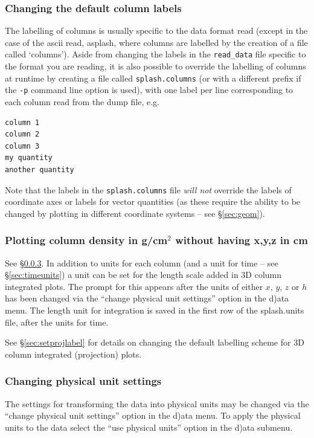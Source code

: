 \documentclass[a4paper,10pt]{article}
\begin{document}
\subsubsection{ Changing the default column labels}
\label{sec:columnsfile}
 The labelling of columns is usually specific to the data format read (except in the case of the ascii read, asplash, where columns are labelled by the creation of a file called `columns'). Aside from changing the labels in the \verb+read_data+ file specific to the format you are reading, it is also possible to override the labelling of columns at runtime by creating a file called \verb+splash.columns+ (or with a different prefix if the \verb+-p+ command line option is used), with one label per line corresponding to each column read from the dump file, e.g.
\begin{verbatim}
column 1
column 2
column 3
my quantity
another quantity
\end{verbatim}
Note that the labels in the \verb+splash.columns+ file \emph{will not} override the labels of coordinate axes or labels for vector quantities (as these require the ability to be changed by plotting in different coordinate systems -- see \S\ref{sec:geom}).
 
\subsubsection{ Plotting column density in g/cm$^{2}$ without having x,y,z in cm}
See \S\ref{sec:changingunits}. In addition to units for each column (and a unit for time -- see \S\ref{sec:timeunits}) a unit can be set for the length scale added in 3D column integrated plots. The prompt for this appears after the units of either $x$, $y$, $z$ or $h$ has been changed via the ``change physical unit settings'' option in the d)ata menu. The length unit for integration is saved in the first row of the splash.units file, after the units for time.

See \S\ref{sec:setprojlabel} for details on changing the default labelling scheme for 3D column integrated (projection) plots.

\subsubsection{ Changing physical unit settings}
\label{sec:changingunits}
The settings for transforming the data into physical units may be changed via the ``change physical unit settings'' option in the d)ata menu. To apply the physical units to the data select the ``use physical units'' option in the d)ata submenu.
\end{document}
